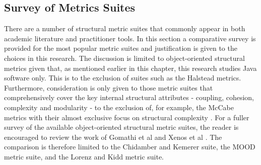 \subsection{Survey of Metrics Suites}
There are a number of structural metric suites that commonly appear in both academic literature and practitioner tools. In this section a comparative survey is provided for the most popular metric suites and justification is given to the choices in this research. The discussion is limited to object-oriented structural metrics given that, as mentioned earlier in this chapter, this research studies Java software only. This is to the exclusion of suites such as the Halstead metrics. Furthermore, consideration is only given to those metric suites that comprehensively cover the key internal structural attributes - coupling, cohesion, complexity and modularity - to the exclusion of, for example, the McCabe metrics with their almost exclusive focus on structural complexity \cite{mccabe1976complexity} \cite{mccabe1989design}. For a fuller survey of the available object-oriented structural metric suites, the reader is encouraged to review the work of Gomathi et al \cite{gomathi2013an} and Xenos et al \cite{xenos2000object}. The comparison is therefore limited to the Chidamber and Kemerer suite, the MOOD metric suite, and the Lorenz and Kidd metric suite.

